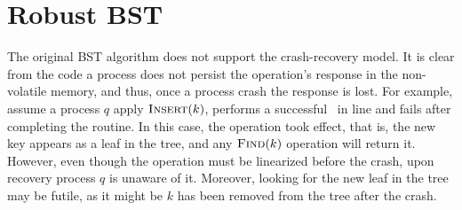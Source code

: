 %
%
\newcommand{\debug}[1]{#1}
%

\newcommand{\lcomment}[1]{\debug{\comment{$\rightarrow$ #1}}}
\newcommand{\incomment}[1]{\debug{[[[#1]]]}}
%
\newcommand{\fM}[1]{\comment{#1 5-14 M.}}
\newcommand{\fD}[1]{\comment{#1 5-21 D.}}
\newcommand{\upcom}[1]{#1}
%



\newenvironment{remark}{\begin{trivlist}
		\item[\hspace{\labelsep}{\bf\noindent Remark. }]}{\end{trivlist}}
%
%

\newenvironment{centre}{\begin{center}}{\end{center}}



\newcommand{\comment}[1]{\marginpar{\tiny #1}}
\newcommand{\mnote}[1]
{\marginpar%
	[{\tiny\begin{minipage}[t]{\marginparwidth}\raggedright#1%
	\end{minipage}}]%
	{\tiny\begin{minipage}[t]{\marginparwidth}\raggedright#1%
	\end{minipage}}%
}



\newcommand{\ignore}[1]{}
\newcommand{\floor}[1]{\left\lfloor #1 \right\rfloor}

\newcommand{\lft}{\mbox{\it left}}




\section{Robust BST}

The original BST algorithm does not support the crash-recovery model. It is clear from the code a process does not persist the operation's response in the non-volatile memory, and thus, once a process crash the response is lost. For example, assume a process $q$ apply $\mbox{\sc Insert} (k)$, performs a successful \CASB\ in line  and fails after completing the  routine. In this case, the  operation took effect, that is, the new key appears as a leaf in the tree, and any $\mbox{\sc Find} (k)$ operation will return it. However, even though the operation must be linearized before the crash, upon recovery process $q$ is unaware of it. Moreover, looking for the new leaf in the tree may be futile, as it might be $k$ has been removed from the tree after the crash.

